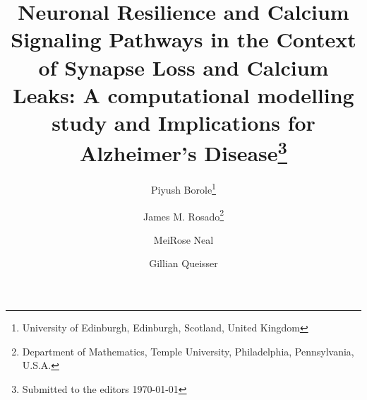 

\ifpdf
\else
\fi

\newcommand{\creflastconjunction}{, and~}
\newcommand{\IP}{IP$_3$}
\newcommand{\Ca}{$\textrm{Ca}^{2+}$~}
\newcommand{\R}{\mathbb{R}}
\newcommand{\cc}{$c_c$}
\newcommand{\ce}{$c_e$}
\newcommand{\co}{$c_o$}
\newcommand{\btot}{$b^{tot}$}
\newcommand{\betot}{$b_e^{tot}$}
\newcommand{\Dc}{$D_c$}
\newcommand{\Db}{$D_b$}
\newcommand{\Dce}{$D_{ce}$}
\newcommand{\Dbe}{$D_{be}$}
\newcommand{\ER}{Endoplasmic Reticulum}



\title{Neuronal Resilience and Calcium Signaling Pathways in the Context of Synapse Loss and Calcium Leaks: A computational modelling study and Implications for Alzheimer's Disease\thanks{Submitted to the editors \today}}

\author{
Piyush Borole\thanks{University of Edinburgh, Edinburgh, Scotland, United Kingdom}
\and James M. Rosado\thanks{Department of Mathematics, Temple University, Philadelphia, Pennsylvania, U.S.A.}
\and MeiRose Neal\footnotemark[3]
 \and Gillian Queisser\footnotemark[3] 
}
\usepackage{amsopn}
\DeclareMathOperator{\diag}{diag}

